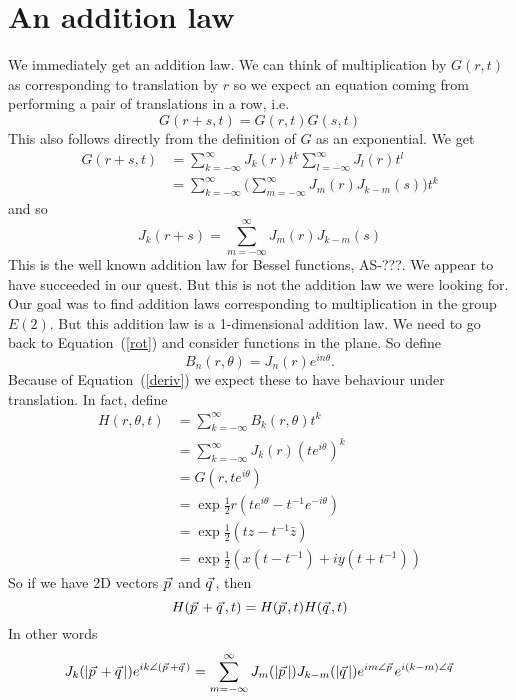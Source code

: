 \documentclass{article}
\newcommand\myvec[1]{\vec{#1}\hspace{0.5mm}}
\begin{document}
\section{An addition law}
We immediately get an addition law.
We can think of multiplication by $G(r,t)$ as corresponding to translation by $r$ so we expect an equation coming from performing a pair of translations in a row, i.e.
\[
G(r+s,t) = G(r,t)G(s,t)
\]
This also follows directly from the definition of $G$ as an exponential.
We get
\begin{align*}
G(r+s,t) &= \sum_{k=-\infty}^\infty J_k(r)t^k\sum_{l=-\infty}^\infty J_l(r)t^l\\
&= \sum_{k=-\infty}^\infty \Big(\sum_{m=-\infty}^\infty J_{m}(r)J_{k-m}(s) \Big) t^k
\end{align*}
and so
\[
J_k(r+s) = \sum_{m=-\infty}^\infty J_{m}(r)J_{k-m}(s)
\]
This is the well known addition law for Bessel functions, AS-???.
We appear to have succeeded in our quest.
But this is not the addition law we were looking for.
Our goal was to find addition laws corresponding to multiplication in the group $E(2)$.
But this addition law is a 1-dimensional addition law.
We need to go back to Equation~(\ref{rot}) and consider functions in the plane.
So define
\[
B_n(r,\theta) = J_n(r)e^{in\theta}.
\]
Because of Equation~(\ref{deriv}) we expect these to have behaviour under translation.
In fact, define
\begin{align*}
H(r,\theta,t) &= \sum_{k=-\infty}^\infty B_k(r,\theta)t^k \\
&= \sum_{k=-\infty}^\infty J_k(r)(te^{i\theta})^k \\
&= G(r,te^{i\theta}) \\
&= \exp\frac{1}{2}r(te^{i\theta}-t^{-1}e^{-i\theta}) \\
&= \exp\frac{1}{2}(tz-t^{-1}\bar{z}) \\
&= \exp\frac{1}{2}(x(t-t^{-1})+iy(t+t^{-1}))
\end{align*}
So if we have 2D vectors $\myvec{p}$ and $\myvec{q}$, then
\[
H(\myvec{p}+\myvec{q},t) = H(\myvec{p},t)H(\myvec{q},t)
\]
In other words
\[
J_k(|\myvec{p}+\myvec{q}|)e^{ik\angle(\myvec{p}+\myvec{q})} = \sum_{m=-\infty}^\infty J_m(|\myvec{p}|)J_{k-m}(|\myvec{q}|)e^{im\angle\myvec{p}}e^{i(k-m)\angle\myvec{q}}
\]


\begin{figure}
\centering
{}
\end{figure}
\end{document}
